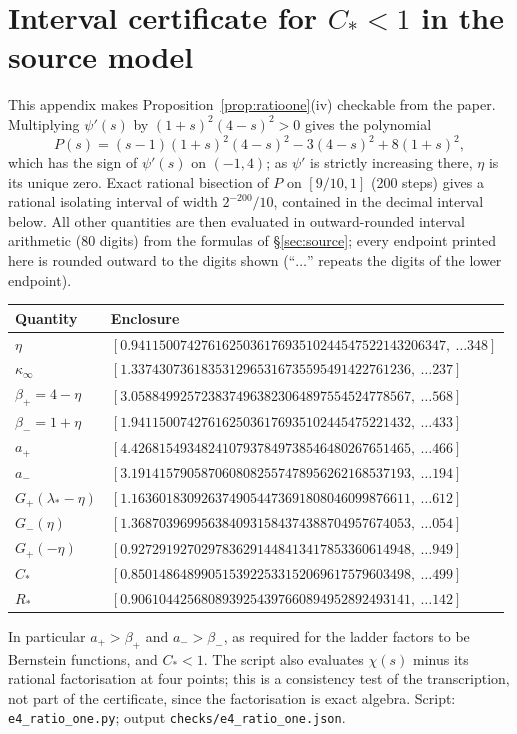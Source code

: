 \documentclass[11pt,a4paper]{article}
\theoremstyle{definition}
\theoremstyle{remark}
\newcommand{\1}{\mathbf 1}
\newcommand{\kinf}{\kappa_\infty}
\begin{document}
\section{Interval certificate for $C_*<1$ in the source model}\label{app:cert}
This appendix makes Proposition~\ref{prop:ratioone}(iv) checkable from the paper. Multiplying $\psi'(s)$ by $(1+s)^2(4-s)^2>0$ gives the polynomial
\[
 P(s)=(s-1)(1+s)^2(4-s)^2-3(4-s)^2+8(1+s)^2,
\]
which has the sign of $\psi'(s)$ on $(-1,4)$; as $\psi'$ is strictly increasing there, $\eta$ is its unique zero. Exact rational bisection of $P$ on $[9/10,1]$ (200 steps) gives a rational isolating interval of width $2^{-200}/10$, contained in the decimal interval below. All other quantities are then evaluated in outward-rounded interval arithmetic (80 digits) from the formulas of \S\ref{sec:source}; every endpoint printed here is rounded outward to the digits shown (``$\ldots$'' repeats the digits of the lower endpoint).
\begin{center}\footnotesize
\begin{tabular}{@{}ll@{}}
\toprule
Quantity & Enclosure\\
\midrule
$\eta$ & $[0.941150074276162503617693510244547522143206347,\ \ldots348]$\\
$\kinf$ & $[1.3374307361835312965316735595491422761236,\ \ldots237]$\\
$\beta_+=4-\eta$ & $[3.0588499257238374963823064897554524778567,\ \ldots568]$\\
$\beta_-=1+\eta$ & $[1.9411500742761625036176935102445475221432,\ \ldots433]$\\
$a_+$ & $[4.4268154934824107937849738546480267651465,\ \ldots466]$\\
$a_-$ & $[3.1914157905870608082557478956262168537193,\ \ldots194]$\\
$G_+(\lambda_*-\eta)$ & $[1.1636018309263749054473691808046099876611,\ \ldots612]$\\
$G_-(\eta)$ & $[1.3687039699563840931584374388704957674053,\ \ldots054]$\\
$G_+(-\eta)$ & $[0.9272919270297836291448413417853360614948,\ \ldots949]$\\
$C_*$ & $[0.8501486489905153922533152069617579603498,\ \ldots499]$\\
$R_*$ & $[0.9061044256808939254397660894952892493141,\ \ldots142]$\\
\bottomrule
\end{tabular}
\end{center}
In particular $a_+>\beta_+$ and $a_->\beta_-$, as required for the ladder factors to be Bernstein functions, and $C_*<1$. The script also evaluates $\chi(s)$ minus its rational factorisation at four points; this is a consistency test of the transcription, not part of the certificate, since the factorisation is exact algebra. Script: \texttt{e4\_ratio\_one.py}; output \texttt{checks/e4\_ratio\_one.json}.
\end{document}
